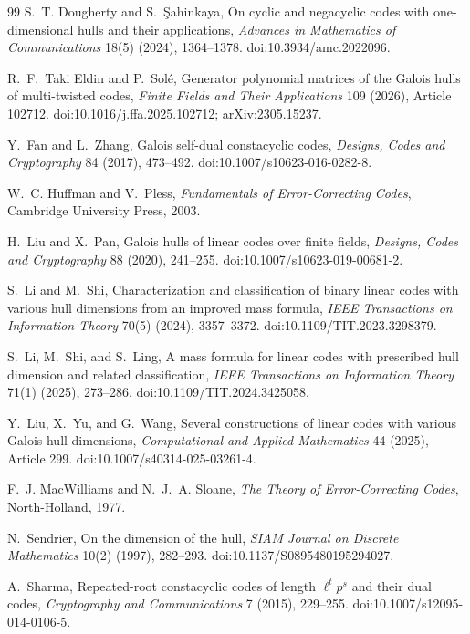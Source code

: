 \documentclass[10pt,journal,draftclsnofoot,onecolumn]{IEEEtran}
\theoremstyle{definition}
\theoremstyle{remark}
\begin{document}
\begin{thebibliography}{99}
S.~T. Dougherty and S.~\c{S}ahinkaya,
On cyclic and negacyclic codes with one-dimensional hulls and their
applications,
\emph{Advances in Mathematics of Communications} 18(5) (2024),
1364--1378. doi:10.3934/amc.2022096.

R.~F.~Taki Eldin and P.~Sol\'e,
Generator polynomial matrices of the Galois hulls of multi-twisted codes,
\emph{Finite Fields and Their Applications} 109 (2026), Article 102712.
doi:10.1016/j.ffa.2025.102712; arXiv:2305.15237.

Y.~Fan and L.~Zhang,
Galois self-dual constacyclic codes,
\emph{Designs, Codes and Cryptography} 84 (2017), 473--492.
doi:10.1007/s10623-016-0282-8.

W.~C. Huffman and V.~Pless,
\emph{Fundamentals of Error-Correcting Codes},
Cambridge University Press, 2003.

H.~Liu and X.~Pan,
Galois hulls of linear codes over finite fields,
\emph{Designs, Codes and Cryptography} 88 (2020), 241--255.
doi:10.1007/s10623-019-00681-2.

S.~Li and M.~Shi,
Characterization and classification of binary linear codes with various
hull dimensions from an improved mass formula,
\emph{IEEE Transactions on Information Theory} 70(5) (2024),
3357--3372. doi:10.1109/TIT.2023.3298379.

S.~Li, M.~Shi, and S.~Ling,
A mass formula for linear codes with prescribed hull dimension and
related classification,
\emph{IEEE Transactions on Information Theory} 71(1) (2025),
273--286. doi:10.1109/TIT.2024.3425058.

Y.~Liu, X.~Yu, and G.~Wang,
Several constructions of linear codes with various Galois hull
dimensions,
\emph{Computational and Applied Mathematics} 44 (2025), Article 299.
doi:10.1007/s40314-025-03261-4.

F.~J. MacWilliams and N.~J.~A. Sloane,
\emph{The Theory of Error-Correcting Codes},
North-Holland, 1977.

N.~Sendrier,
On the dimension of the hull,
\emph{SIAM Journal on Discrete Mathematics} 10(2) (1997), 282--293.
doi:10.1137/S0895480195294027.

A.~Sharma,
Repeated-root constacyclic codes of length \(\ell^t p^s\) and their
dual codes,
\emph{Cryptography and Communications} 7 (2015), 229--255.
doi:10.1007/s12095-014-0106-5.


\end{thebibliography}
\end{document}

